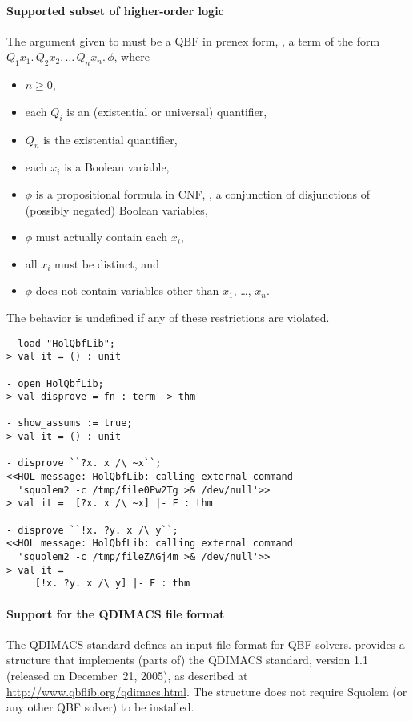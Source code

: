 \paragraph{Supported subset of higher-order logic}

The argument given to  must be a QBF in prenex form, \ie,
a term of the form $Q_1 x_1. \, Q_2 x_2. \, \ldots \, Q_n x_n. \,
\phi$, where
\begin{itemize}
\item $n \geq 0$,
\item each $Q_i$ is an (existential or universal) quantifier,
\item $Q_n$ is the existential quantifier,
\item each $x_i$ is a Boolean variable,
\item $\phi$ is a propositional formula in CNF, \ie, a conjunction of
  disjunctions of (possibly negated) Boolean variables,
\item $\phi$ must actually contain each $x_i$,
\item all $x_i$ must be distinct, and
\item $\phi$ does not contain variables other than $x_1$, \dots,
  $x_n$.
\end{itemize}
The behavior is undefined if any of these restrictions are violated.

\begin{session}
\begin{verbatim}
- load "HolQbfLib";
> val it = () : unit

- open HolQbfLib;
> val disprove = fn : term -> thm

- show_assums := true;
> val it = () : unit

- disprove ``?x. x /\ ~x``;
<<HOL message: HolQbfLib: calling external command
  'squolem2 -c /tmp/file0Pw2Tg >& /dev/null'>>
> val it =  [?x. x /\ ~x] |- F : thm

- disprove ``!x. ?y. x /\ y``;
<<HOL message: HolQbfLib: calling external command
  'squolem2 -c /tmp/fileZAGj4m >& /dev/null'>>
> val it =
     [!x. ?y. x /\ y] |- F : thm
\end{verbatim}
\end{session}

\paragraph{Support for the QDIMACS file format}

The QDIMACS standard defines an input file format for QBF solvers.
 provides a structure  that implements
(parts of) the QDIMACS standard, version 1.1 (released on December~21,
2005), as described at \url{http://www.qbflib.org/qdimacs.html}.  The
 structure does not require Squolem (or any other QBF
solver) to be installed.

